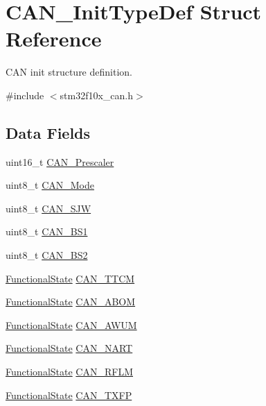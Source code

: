 \hypertarget{struct_c_a_n___init_type_def}{}\section{C\+A\+N\+\_\+\+Init\+Type\+Def Struct Reference}
\label{struct_c_a_n___init_type_def}


C\+AN init structure definition.  




{\ttfamily \#include $<$stm32f10x\+\_\+can.\+h$>$}

\subsection*{Data Fields}
\begin{DoxyCompactItemize}
\item 
uint16\+\_\+t \mbox{\hyperlink{struct_c_a_n___init_type_def_abebaaf7d2ff24fcc501c5f39c00b8742}{C\+A\+N\+\_\+\+Prescaler}}
\item 
uint8\+\_\+t \mbox{\hyperlink{struct_c_a_n___init_type_def_ab06e41b2b56aa5aee6d27bdc07ca1bcf}{C\+A\+N\+\_\+\+Mode}}
\item 
uint8\+\_\+t \mbox{\hyperlink{struct_c_a_n___init_type_def_ad3a242b080dd6b9bda227520bf15a580}{C\+A\+N\+\_\+\+S\+JW}}
\item 
uint8\+\_\+t \mbox{\hyperlink{struct_c_a_n___init_type_def_a6244c64f0e5ff7fb26d8aefb272787c5}{C\+A\+N\+\_\+\+B\+S1}}
\item 
uint8\+\_\+t \mbox{\hyperlink{struct_c_a_n___init_type_def_a590ee9ab09e8c53d829444bdff407f1c}{C\+A\+N\+\_\+\+B\+S2}}
\item 
\mbox{\hyperlink{group___exported__types_gac9a7e9a35d2513ec15c3b537aaa4fba1}{Functional\+State}} \mbox{\hyperlink{struct_c_a_n___init_type_def_ad3f995849aaf6dfbd79e0e70a37f28a9}{C\+A\+N\+\_\+\+T\+T\+CM}}
\item 
\mbox{\hyperlink{group___exported__types_gac9a7e9a35d2513ec15c3b537aaa4fba1}{Functional\+State}} \mbox{\hyperlink{struct_c_a_n___init_type_def_a35b9420322c66febde319a638354e596}{C\+A\+N\+\_\+\+A\+B\+OM}}
\item 
\mbox{\hyperlink{group___exported__types_gac9a7e9a35d2513ec15c3b537aaa4fba1}{Functional\+State}} \mbox{\hyperlink{struct_c_a_n___init_type_def_a8f5475c5b4c675c4662f62c23fd58097}{C\+A\+N\+\_\+\+A\+W\+UM}}
\item 
\mbox{\hyperlink{group___exported__types_gac9a7e9a35d2513ec15c3b537aaa4fba1}{Functional\+State}} \mbox{\hyperlink{struct_c_a_n___init_type_def_ad956a58de0401d8bdd582b5f92c6fa82}{C\+A\+N\+\_\+\+N\+A\+RT}}
\item 
\mbox{\hyperlink{group___exported__types_gac9a7e9a35d2513ec15c3b537aaa4fba1}{Functional\+State}} \mbox{\hyperlink{struct_c_a_n___init_type_def_a8e091965db871827fca02c636f42e3ac}{C\+A\+N\+\_\+\+R\+F\+LM}}
\item 
\mbox{\hyperlink{group___exported__types_gac9a7e9a35d2513ec15c3b537aaa4fba1}{Functional\+State}} \mbox{\hyperlink{struct_c_a_n___init_type_def_a8f9c54b9a3f5663b482247a23d9cbf20}{C\+A\+N\+\_\+\+T\+X\+FP}}
\end{DoxyCompactItemize}


